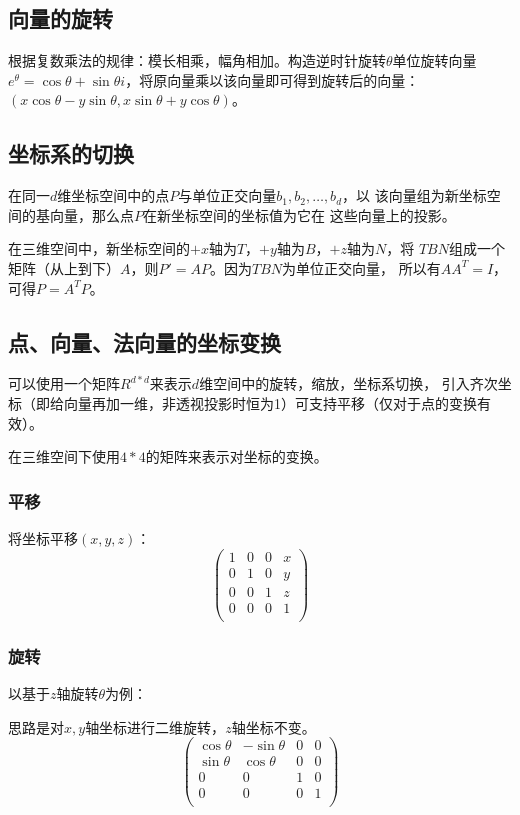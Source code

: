 \subsection{向量的旋转}
根据复数乘法的规律：模长相乘，幅角相加。构造逆时针旋转$\theta$单位旋转向量
$e^\theta=\cos \theta+\sin \theta i$，将原向量乘以该向量即可得到旋转后的向量：
$(x\cos \theta-y\sin \theta,x\sin \theta+y\cos \theta)$。
\subsection{坐标系的切换}
在同一$d$维坐标空间中的点$P$与单位正交向量$b_1,b_2,\ldots,b_d$，以
该向量组为新坐标空间的基向量，那么点$P$在新坐标空间的坐标值为它在
这些向量上的投影。

在三维空间中，新坐标空间的$+x$轴为$T$，$+y$轴为$B$，$+z$轴为$N$，将
$TBN$组成一个矩阵（从上到下）$A$，则$P'=AP$。因为$TBN$为单位正交向量，
所以有$AA^T=I$，可得$P=A^TP$。
\subsection{点、向量、法向量的坐标变换}
可以使用一个矩阵$R^{d*d}$来表示$d$维空间中的旋转，缩放，坐标系切换，
引入齐次坐标（即给向量再加一维，非透视投影时恒为1）可支持平移（仅对于点的变换有效）。

在三维空间下使用$4*4$的矩阵来表示对坐标的变换。

\subsubsection{平移}
将坐标平移$(x,y,z)$：
\begin{displaymath}
	\left(\begin{array}{cccc}
		1 & 0 & 0 & x \\
		0 & 1 & 0 & y \\
		0 & 0 & 1 & z \\
		0 & 0 & 0 & 1 \\
	\end{array}\right)
\end{displaymath}
\subsubsection{旋转}
以基于$z$轴旋转$\theta$为例：

思路是对$x,y$轴坐标进行二维旋转，$z$轴坐标不变。
\begin{displaymath}
	\left(\begin{array}{cccc}
		\cos \theta & -\sin \theta & 0 & 0 \\
		\sin \theta & \cos \theta  & 0 & 0 \\
		0           & 0            & 1 & 0 \\
		0           & 0            & 0 & 1 \\
	\end{array}\right)
\end{displaymath}
